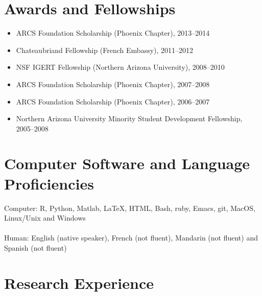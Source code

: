 \documentclass[a4paper]{article}
\begin{document}
\section{Awards and Fellowships}\label{awards-and-fellowships}

\begin{itemize}
\item
  ARCS Foundation Scholarship (Phoenix Chapter), 2013--2014
\item
  Chateaubriand Fellowship (French Embassy), 2011--2012
\item
  NSF IGERT Fellowship (Northern Arizona University), 2008--2010
\item
  ARCS Foundation Scholarship (Phoenix Chapter), 2007--2008
\item
  ARCS Foundation Scholarship (Phoenix Chapter), 2006--2007
\item
  Northern Arizona University Minority Student Development Fellowship,
  2005--2008
\end{itemize}

\section{Computer Software and Language
Proficiencies}\label{computer-software-and-language-proficiencies}

Computer: R, Python, Matlab, LaTeX, HTML, Bash, ruby, Emacs, git,
MacOS, Linux/Unix and Windows\\\\Human: English (native speaker),
French (not fluent), Mandarin (not fluent) and Spanish (not fluent)

\section{Research Experience}\label{research-experience}
\end{document}
